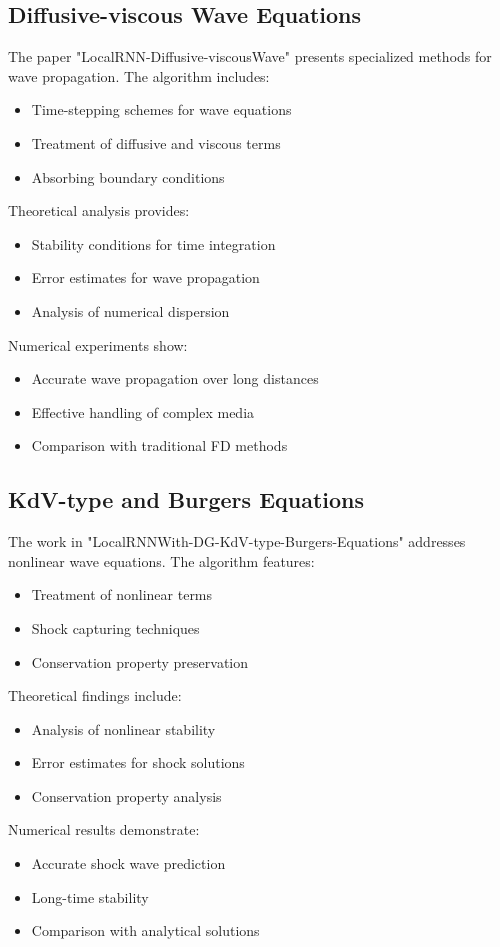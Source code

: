 \documentclass[12pt]{article}
\begin{document}
\subsection{Diffusive-viscous Wave Equations}
\label{subsec:local_rnn_wave}
The paper "LocalRNN-Diffusive-viscousWave" presents specialized methods for wave propagation. The algorithm includes:
\begin{itemize}
    \item Time-stepping schemes for wave equations
    \item Treatment of diffusive and viscous terms
    \item Absorbing boundary conditions
\end{itemize}
Theoretical analysis provides:
\begin{itemize}
    \item Stability conditions for time integration
    \item Error estimates for wave propagation
    \item Analysis of numerical dispersion
\end{itemize}
Numerical experiments show:
\begin{itemize}
    \item Accurate wave propagation over long distances
    \item Effective handling of complex media
    \item Comparison with traditional FD methods
\end{itemize}

\subsection{KdV-type and Burgers Equations}
\label{subsec:local_rnn_kdv}
The work in "LocalRNNWith-DG-KdV-type-Burgers-Equations" addresses nonlinear wave equations. The algorithm features:
\begin{itemize}
    \item Treatment of nonlinear terms
    \item Shock capturing techniques
    \item Conservation property preservation
\end{itemize}
Theoretical findings include:
\begin{itemize}
    \item Analysis of nonlinear stability
    \item Error estimates for shock solutions
    \item Conservation property analysis
\end{itemize}
Numerical results demonstrate:
\begin{itemize}
    \item Accurate shock wave prediction
    \item Long-time stability
    \item Comparison with analytical solutions
\end{itemize}
\end{document}
